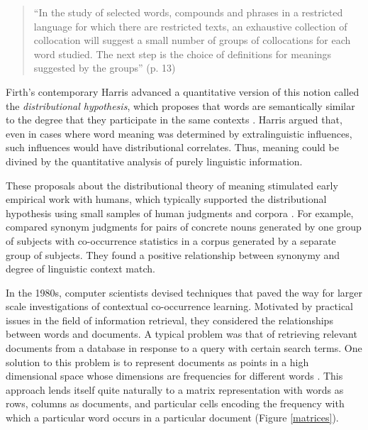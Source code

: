 \documentclass[man,floatsintext]{apa6}
\begin{document}
\begin{quote}
``In the study of selected words, compounds and phrases in a restricted language for which there are restricted texts, an exhaustive collection of collocation will suggest a small number of groups of collocations for each word studied. The next step is the choice of definitions for meanings suggested by the groups'' (p. 13)
\end{quote}
Firth's contemporary Harris advanced a quantitative version of this notion called the \emph{distributional hypothesis}, which proposes that words are semantically similar to the degree that they participate in the same contexts \citep{harris1951}. Harris argued that, even in cases where word meaning was determined by extralinguistic influences, such influences would have distributional correlates. Thus, meaning could be divined by the quantitative analysis of purely linguistic information.

These proposals about the distributional theory of meaning stimulated early empirical work with humans, which typically supported the distributional hypothesis using small samples of human judgments and corpora \citep{rubenstein1965, clark1968, stefflre1971, geffroy1973, berryrogghe1973, szalay1974}. For example, \citet{rubenstein1965} compared synonym judgments for pairs of concrete nouns generated by one group of subjects with co-occurrence statistics in a corpus generated by a separate group of subjects. They found a positive relationship between synonymy and degree of linguistic context match.

In the 1980s, computer scientists devised techniques that paved the way for larger scale investigations of contextual co-occurrence learning. Motivated by practical issues in the field of information retrieval, they considered the relationships between words and documents. A typical problem was that of retrieving relevant documents from a database in response to a query with certain search terms. One solution to this problem is to represent documents as points in a high dimensional space whose dimensions are frequencies for different words \citep{salton1986}. This approach lends itself quite naturally to a matrix representation with words as rows, columns as documents, and particular cells encoding the frequency with which a particular word occurs in a particular document (Figure \ref{matrices}).
\end{document}
